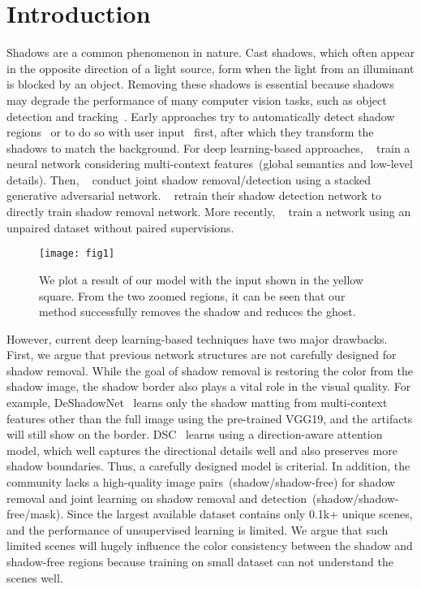 \documentclass[letterpaper]{article} \usepackage{aaai20}  \usepackage{times}  \usepackage{helvet} \usepackage{courier}  \usepackage[hyphens]{url}  \urlstyle{rm} \def\UrlFont{\rm}  \usepackage{graphicx}  \frenchspacing  \setlength{\pdfpagewidth}{8.5in}  \setlength{\pdfpageheight}{11in}  \usepackage{amssymb}
\begin{document}
\section{Introduction}
\noindent Shadows are a common phenomenon in nature. Cast shadows, which often appear in the opposite direction of a light source, form when the light from an illuminant is blocked by an object.  
Removing these shadows is essential because shadows may degrade the performance of many computer vision tasks, such as object detection and tracking~\cite{mikic2000moving,khan2015automatic}. Early approaches try to automatically detect shadow regions~\cite{Guo:2013tt,khan2015automatic} or to do so with user input~\cite{gong2014interactive,yang2012shadow} first, after which they transform the shadows to match the background. For deep learning-based approaches, \citeauthor{qu2017deshadownet}~ train a neural network considering multi-context features~(global semantics and low-level details). Then, \citeauthor{wang2018stacked}~ conduct joint shadow removal/detection using a stacked generative adversarial network. \citeauthor{Hu:2018wd}~ retrain their shadow detection network to directly train shadow removal network. More recently, \citeauthor{Anonymous:XfCvZjhb}~ train a network using an unpaired dataset without paired supervisions. 

\begin{figure}[t]
 \centering
  \texttt{[image: fig1]}
  \caption{We plot a result of our model with the input shown in the yellow square. From the two zoomed regions, it can be seen that our method successfully removes the shadow and reduces the ghost.}
  \label{fig:detail}
\end{figure}

However, current deep learning-based techniques have two major drawbacks. First, we argue that previous network structures are not carefully designed for shadow removal. While the goal of shadow removal is restoring the color from the shadow image, the shadow border also plays a vital role in the visual quality. For example, DeShadowNet~\cite{qu2017deshadownet} learns only the shadow matting from multi-context features other than the full image using the pre-trained VGG19, and the artifacts will still show on the border. DSC~\cite{Hu:2018wd} learns using a direction-aware attention model, which well captures the directional details well and also preserves more shadow boundaries. Thus, a carefully designed model is criterial. In addition, the community lacks a high-quality image pairs~(shadow/shadow-free) for shadow removal and joint learning on shadow removal and detection~(shadow/shadow-free/mask). Since the largest available dataset contains only 0.1k+ unique scenes, and the performance of unsupervised learning is limited. We argue that such limited scenes will hugely influence the color consistency between the shadow and shadow-free regions because training on small dataset can not understand the scenes well.
\end{document}
